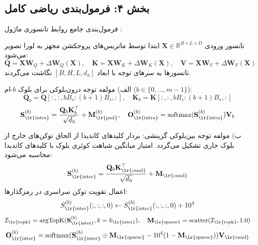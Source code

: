 \subsection*{بخش ۴: فرمول‌بندی ریاضی کامل }
فرمول‌بندی جامع روابط تانسوری ماژول :

تانسور ورودی $\mathbf{X} \in \mathbb{R}^{B \times L \times D}$ ابتدا توسط ماتریس‌های پروجکشن مجهز به لورا تصویر می‌شود:
\begin{equation}
\mathbf{Q} = \mathbf{X}\mathbf{W}_Q + \Delta \mathbf{W}_Q(\mathbf{X}), \quad \mathbf{K} = \mathbf{X}\mathbf{W}_K + \Delta \mathbf{W}_K(\mathbf{X}), \quad \mathbf{V} = \mathbf{X}\mathbf{W}_V + \Delta \mathbf{W}_V(\mathbf{X})
\end{equation}
تانسورها به سرهای توجه با ابعاد $[B, H, L, d_h]$ نگاشت می‌گردند.

الف) مولفه توجه درون‌بلوکی برای بلوک $b$-ام ($b \in \{0, \dots, m-1\}$):
\begin{equation}
\mathbf{Q}_b = \mathbf{Q}[:, :, b B_s : (b+1) B_s, :], \quad \mathbf{K}_b = \mathbf{K}[:, :, b B_s : (b+1) B_s, :]
\end{equation}
\begin{equation}
\mathbf{S}_{\text{\lr{intra}}}^{(b)} = \frac{\mathbf{Q}_b \mathbf{K}_b^\top}{\sqrt{d_h}} + \mathbf{M}_{\text{\lr{pad}}}^{(b)}, \quad \mathbf{O}_{\text{\lr{intra}}}^{(b)} = \operatorname{softmax}(\mathbf{S}_{\text{\lr{intra}}}^{(b)}) \mathbf{V}_b
\end{equation}

ب) مولفه توجه بین‌بلوکی گزینشی:
بردار کلیدهای کاندیدا از الحاق توکن‌های خارج از بلوک جاری تشکیل می‌گردد. امتیاز میانگین شباهت کوئری بلوک با کلیدهای کاندیدا محاسبه می‌شود:
\begin{equation}
\mathbf{S}_{\text{\lr{inter}}}^{(b)} = \frac{\mathbf{Q}_b \mathbf{K}_{\text{\lr{cand}}}^\top}{\sqrt{d_h}} + \mathbf{M}_{\text{\lr{cand}}}
\end{equation}
اعمال تقویت توکن سراسری در رمزگذارها:
\begin{equation}
S_{\text{\lr{inter}}}^{(b)}(:, :, :, 0) \leftarrow S_{\text{\lr{inter}}}^{(b)}(:, :, :, 0) + 10^4
\end{equation}
\begin{equation}
\mathcal{I}_{\text{\lr{topk}}} = \operatorname{argTopK}(\mathbf{S}_{\text{\lr{inter}}}^{(b)}, k=k_{\text{\lr{inter}}}), \quad \mathbf{M}_{\text{\lr{sparse}}} = \operatorname{scatter}(\mathcal{I}_{\text{\lr{topk}}}, 1.0)
\end{equation}
\begin{equation}
\mathbf{O}_{\text{\lr{inter}}}^{(b)} = \operatorname{softmax}(\mathbf{S}_{\text{\lr{inter}}}^{(b)} \odot \mathbf{M}_{\text{\lr{sparse}}} - 10^4 (1 - \mathbf{M}_{\text{\lr{sparse}}})) \mathbf{V}_{\text{\lr{cand}}}
\end{equation}

